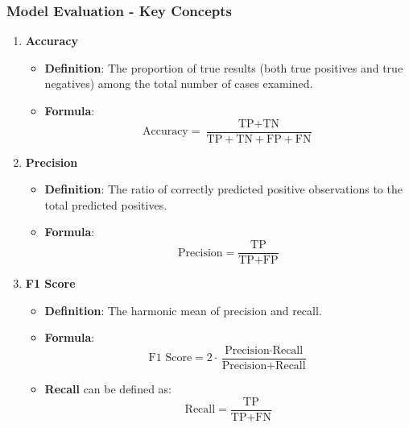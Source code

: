 \documentclass[aspectratio=169]{beamer}
\begin{document}
\begin{frame}[fragile]
    \frametitle{Model Evaluation - Key Concepts}
    \begin{enumerate}
        \item \textbf{Accuracy}
            \begin{itemize}
                \item \textbf{Definition}: The proportion of true results (both true positives and true negatives) among the total number of cases examined.
                \item \textbf{Formula}:
                \begin{equation}
                    \text{Accuracy} = \frac{\text{TP} + \text{TN}}{\text{TP} + \text{TN} + \text{FP} + \text{FN}}
                \end{equation}
            \end{itemize}
        \item \textbf{Precision}
            \begin{itemize}
                \item \textbf{Definition}: The ratio of correctly predicted positive observations to the total predicted positives.
                \item \textbf{Formula}:
                \begin{equation}
                    \text{Precision} = \frac{\text{TP}}{\text{TP} + \text{FP}}
                \end{equation}
            \end{itemize}
        \item \textbf{F1 Score}
            \begin{itemize}
                \item \textbf{Definition}: The harmonic mean of precision and recall.
                \item \textbf{Formula}:
                \begin{equation}
                    \text{F1 Score} = 2 \cdot \frac{\text{Precision} \cdot \text{Recall}}{\text{Precision} + \text{Recall}}
                \end{equation}
                \item \textbf{Recall} can be defined as:
                \begin{equation}
                    \text{Recall} = \frac{\text{TP}}{\text{TP} + \text{FN}}
                \end{equation}
            \end{itemize}
    \end{enumerate}
\end{frame}
\end{document}
